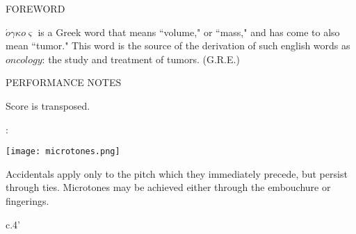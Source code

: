 \documentclass[10pt]{article}
\begin{document}
\begin{center}
\huge FOREWORD
\end{center}

\begingroup
\begin{center}
\hspace{10mm} $\acute{o} \gamma \kappa o \varsigma$ is a Greek word that means ``volume," or ``mass," and has come to also mean ``tumor." This word is the source of the derivation of such english words as $oncology$: the study and treatment of tumors. 
\rightskip\leftskip
\phantom{text} \hfill (G.R.E.)
\end{center}
\endgroup

\vspace*{1.5\baselineskip}
  
\vspace*{1\baselineskip}

\begin{center}
\huge PERFORMANCE NOTES
\end{center}

\begin{center}
Score is transposed.
\end{center}

\begin{center}
:
\end{center}

\begin{center}
\texttt{[image: microtones.png]}
\end{center}

\begin{center}
Accidentals apply only to the pitch which they immediately precede, but persist through ties. Microtones may be achieved either through the embouchure or fingerings.
\end{center}


\vspace*{1\baselineskip}

\begin{center}
c.4'
\end{center}
\end{document}
